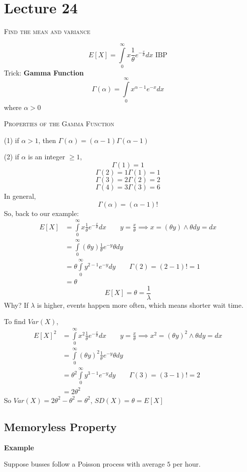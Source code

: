 \section{Lecture 24}
\textsc{Find the mean and variance}

\[ E[X]=\int\limits_{0}^{\infty} x \frac{1}{\theta}e^{-\frac{x}{\theta}} d{x}  \text{ IBP} \]
Trick: \textbf{Gamma Function}
\[ \Gamma(\alpha)=\int\limits_{0}^{\infty} x^{\alpha -1}e^{-x} d{x}  \]
where $ \alpha>0 $

\textsc{Properties of the Gamma Function}

(1) if $ \alpha>1 $, then $ \Gamma(\alpha)=(\alpha-1)\Gamma(\alpha-1) $

(2) if $ \alpha $ is an integer $ \ge 1 $,
\[ \Gamma(1)=1 \]
\[ \Gamma(2)=1\Gamma(1)=1 \]
\[ \Gamma(3)=2\Gamma(2)=2 \]
\[ \Gamma(4)=3\Gamma(3)=6 \]
In general,
\[ \Gamma(\alpha)=(\alpha-1)! \]
So, back to our example:
\begin{align*}
    E[X]&=\int\limits_{0}^{\infty} x \frac{1}{\theta}e^{-\frac{x}{\theta}} d{x}\qquad y=\frac{x}{\theta}\implies x=(\theta y) \land \theta dy=dx\\
    &=\int\limits_{0}^{\infty} (\theta y) \frac{1}{\theta} e^{-y}\theta d{y}\\
    &=\theta \int\limits_{0}^{\infty} y^{2-1}e^{-y} d{y}\qquad \Gamma(2)=(2-1)!=1\\
    &=\theta
\end{align*}
\[ E[X]=\theta=\frac{1}{\lambda} \]
Why?
If $ \lambda $ is higher, events happen more often, which means shorter wait time.

To find $ Var(X) $,
\begin{align*}
    E[X]^2&=\int\limits_{0}^{\infty} x^2 \frac{1}{\theta}e^{-\frac{x}{\theta}}  d{x}\qquad y=\frac{x}{\theta}\implies x^2=(\theta y)^2 \land \theta dy=dx\\
    &=\int\limits_{0}^{\infty} (\theta y)^2\frac{1}{\theta}e^{-y}\theta d{y}\\
    &=\theta^2 \int\limits_{0}^{\infty} y^{3-1}e^{-y} d{y} \qquad \Gamma(3)=(3-1)!=2\\
    &=2\theta^2
\end{align*}
So $ Var(X)=2\theta^2-\theta^2=\theta^2 $, $ SD(X)=\theta=E[X] $

\subsection{Memoryless Property}
\textbf{Example}

Suppose busses follow a Poisson process with average $ 5 $ per hour.

